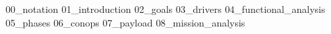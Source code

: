 {00_notation}
\pagebreak
{}
{01_introduction}
{02_goals}
{03_drivers}
{04_functional_analysis}
{05_phases}
{06_conops}
\pagebreak
{07_payload}
{08_mission_analysis}